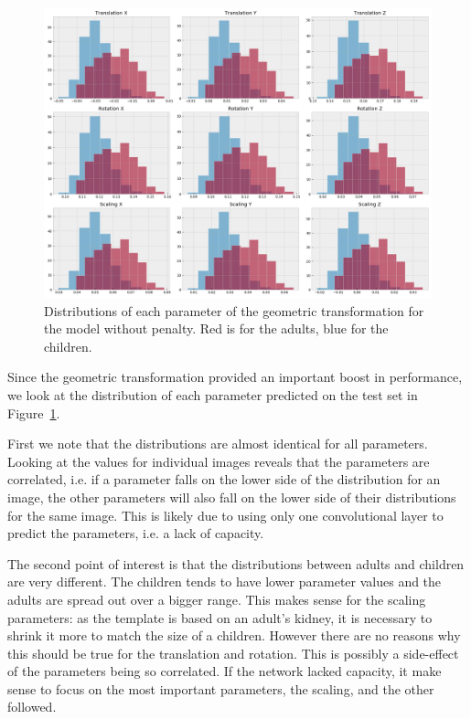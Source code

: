 \begin{figure}[htbp]
    \centering
	\includegraphics[width=\textwidth]{img_seg/transfo_matrix}
    \caption{Distributions of each parameter of the geometric transformation for the model without penalty. Red is for the adults, blue for the children.}
    \label{fig:transfo_matrix}
\end{figure}

Since the geometric transformation provided an important boost in performance, we look at the distribution of each parameter predicted on the test set in Figure~\ref{fig:transfo_matrix}. 

First we note that the distributions are almost identical for all parameters. Looking at the values for individual images reveals that the parameters are correlated, i.e. if a parameter falls on the lower side of the distribution for an image, the other parameters will also fall on the lower side of their distributions for the same image. This is likely due to using only one convolutional layer to predict the parameters, i.e. a lack of capacity.

The second point of interest is that the distributions between adults and children are very different. The children tends to have lower parameter values and the adults are spread out over a bigger range. This makes sense for the scaling parameters: as the template is based on an adult's kidney, it is necessary to shrink it more to match the size of a children. However there are no reasons why this should be true for the translation and rotation. This is possibly a side-effect of the parameters being so correlated. If the network lacked capacity, it make sense to focus on the most important parameters, the scaling, and the other followed.

